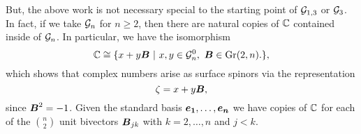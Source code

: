 But, the above work is not necessary special to the starting point of $\mathcal{G}_{1,3}$ or $\mathcal{G}_3$. In fact, if we take $\mathcal{G}_n$ for $n\geq 2$, then there are natural copies of $\mathbb{C}$ contained inside of $\mathcal{G}_n$. In particular, we have the isomorphism
\begin{equation}
\label{eq:c_isomorphisms}
    \mathbb{C} \cong \{x + y \boldsymbol{B} ~\vert~ x,y \in \mathcal{G}_n^0,~ \boldsymbol{B} \in \operatorname{Gr}(2,n). \},
\end{equation}
which shows that complex numbers arise as surface spinors via the representation
\begin{equation}
        \zeta = x + y\boldsymbol{B},
\end{equation}
since $\boldsymbol{B}^2=-1$. Given the standard basis $\boldsymbol{e_1},\dots,\boldsymbol{e_n}$ we have copies of $\mathbb{C}$ for each of the ${ n \choose 2}$ unit bivectors $\boldsymbol{B}_{jk}$ with $k=2,\dots,n$ and $j<k$.



